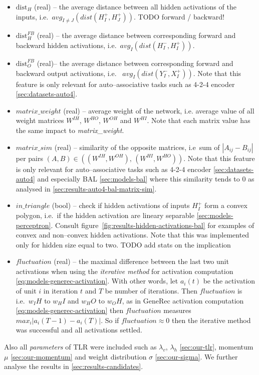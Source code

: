 \begin{itemize} 
\item $\mbox{dist}_{H}$ (real) -- the average distance between all hidden activations of the inputs, i.e.~$avg_{I \neq J}\left(dist(H_I^{+},H_J^{+})\right)$. TODO forward / backward! 

\label{sec:our-dist-h-fb}
\item $\mbox{dist}_{H}^{FB}$ (real) -- the average distance between corresponding forward and backward hidden activations, i.e.~$avg_{I}\left(dist(H_I^{-},H_I^{+})\right)$.

\item	$\mbox{dist}_{O}^{FB}$ (real)-- the average distance between corresponding forward and backward output activations, i.e.~  $avg_{I}\left(dist(Y_I^{-},X_I^{+})\right)$. Note that this feature is only relevant for auto--associative tasks such as 4-2-4 encoder \ref{sec:datasets-auto4}. 

\item $matrix\_weight$ (real) -- average weight of the network, i.e. average value of all weight matrices $W^{IH}$, $W^{HO}$, $W^{OH}$ and $W^{HI}$. Note that each matrix value has the same impact to \emph{matrix\_weight}. 

\item $matrix\_sim$ (real) -- similarity of the opposite matrices, i.e~sum of $|A_{ij} - B_{ij}|$ per pairs $(A,B) \in ((W^{IH}, W^{OH}),\, (W^{HI}, W^{HO}))$. Note that this feature is only relevant for auto--associative tasks such as 4-2-4 encoder \ref{sec:datasets-auto4} and especially BAL \ref{sec:models-bal} where this similarity tends to 0 as analysed in \ref{sec:results-auto4-bal-matrix-sim}. 

\label{sec:our-in-triangle}
\item $in\_triangle$ (bool) -- check if hidden activations of inputs  $H_I^{+}$ form a convex polygon, i.e.~if the hidden activation are lineary separable \ref{sec:models-perceptron}. Consult figure~\ref{fig:results-hidden-activations-bal} for examples of convex and non--convex hidden activations. Note that this was implemented only for hidden size equal to two. TODO add stats on the implication 

\label{eq:our-fluctuation}
\item $fluctuation$ (real) -- the maximal difference between the last two unit activations when using the \emph{iterative method} for activation computation \ref{eq:models-generec-activation}. With other words, let $a_i(t)$ be the activation of unit $i$ in iteration $t$ and $T$ be number of iterations. Then $fluctuation$ is i.e.~$w_IH$ to $w_HI$ and $w_HO$ to $w_OH$, as in GeneRec activation computation \ref{eq:models-generec-activation} then $fluctuation$ measures $max_i|a_i(T-1) - a_i(T)|$. So if $fluctuation \approx 0$ then the iterative method was successful and all activations settled.
\end{itemize} 

Also all \emph{parameters} of TLR were included such as $\lambda_v$, $\lambda_h$ \ref{sec:our-tlr}, momentum $\mu$ \ref{sec:our-momentum} and weight distribution $\sigma$ \ref{sec:our-sigma}. We further analyse the results in \ref{sec:results-candidates}. 
